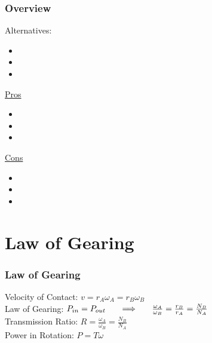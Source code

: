 \documentclass[fleqn]{beamer} %
\newcommand{\sectiontitleI}{Overview} %
\newcommand{\sectiontitleII}{Law of Gearing}
\begin{document}
	\begin{frame} \small
		\frametitle{\sectiontitleI}

		Alternatives:
		\begin{itemize}
			\item  
			\item
			\item
        \end{itemize}


        \begin{multicols}{2}
		\underline{Pros}
		\begin{itemize}
		\item
		\item
		\item
		\end{itemize}
		\underline{Cons}
		\begin{itemize}
		\item 
		\item
		\item
		\end{itemize}
		\end{multicols}

	\end{frame}

	
\section{\sectiontitleII}	

	\begin{frame}[label=sectionI] \small
		\frametitle{\sectiontitleII}

		Velocity of Contact:\hspace{5mm} $v = r_A  \omega _A = r_B \omega_B $ \vspace{10mm}\\

		Law of Gearing:\hspace{5mm} $P_{in}=P_{out} \hspace{5mm} \implies \hspace{5mm} \frac{\omega_A}{\omega_B}=\frac{r_B}{r_A}=\frac{N_B}{N_A}$ \vspace{10mm}\\

		Transmission Ratio:\hspace{5mm} $R=\frac{\omega_A}{\omega_B}=\frac{N_B}{N_A}$  \vspace{10mm}\\

		Power in Rotation:\hspace{5mm} $P=T \omega$ 

	\end{frame}
\end{document}
